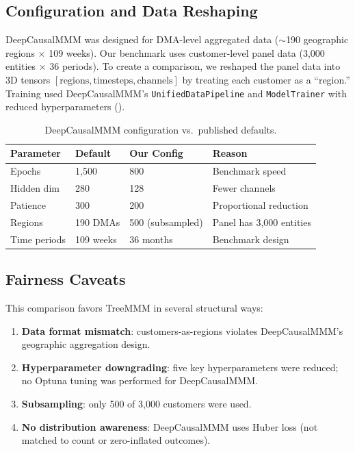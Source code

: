 \documentclass[review,12pt]{elsarticle}
\begin{document}
\subsection{Configuration and Data Reshaping}
\label{app:neural:config}

DeepCausalMMM was designed for DMA-level aggregated data ($\sim$190 geographic
regions $\times$ 109 weeks). Our benchmark uses customer-level panel data
(3,000 entities $\times$ 36 periods). To create a comparison, we reshaped the
panel data into 3D tensors $[\text{regions}, \text{timesteps}, \text{channels}]$
by treating each customer as a ``region.'' Training used DeepCausalMMM's
\texttt{UnifiedDataPipeline} and \texttt{ModelTrainer} with reduced
hyperparameters ().

\begin{table}[ht]
\centering
\caption{DeepCausalMMM configuration vs.\ published defaults.}
\label{tab:app_deepcausal_config}
\begin{tabular}{@{}llll@{}}
\toprule
Parameter & Default & Our Config & Reason \\
\midrule
Epochs          & 1,500 & 800 & Benchmark speed \\
Hidden dim      & 280   & 128 & Fewer channels \\
Patience        & 300   & 200 & Proportional reduction \\
Regions         & 190 DMAs & 500 (subsampled) & Panel has 3,000 entities \\
Time periods    & 109 weeks & 36 months & Benchmark design \\
\bottomrule
\end{tabular}
\end{table}

\subsection{Fairness Caveats}
\label{app:neural:caveats}

This comparison favors TreeMMM in several structural ways:
\begin{enumerate}
\item \textbf{Data format mismatch}: customers-as-regions violates
  DeepCausalMMM's geographic aggregation design.
\item \textbf{Hyperparameter downgrading}: five key hyperparameters were
  reduced; no Optuna tuning was performed for DeepCausalMMM.
\item \textbf{Subsampling}: only 500 of 3,000 customers were used.
\item \textbf{No distribution awareness}: DeepCausalMMM uses Huber loss (not
  matched to count or zero-inflated outcomes).
\end{enumerate}
\end{document}
